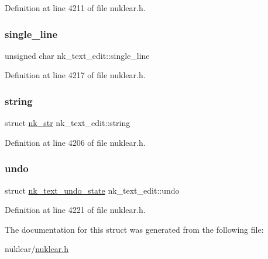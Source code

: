 Definition at line 4211 of file nuklear.\+h.

\mbox{\label{structnk__text__edit_a62aa1bf8ccab646b578c15fee5e6e60d}} 
\subsubsection{\texorpdfstring{single\+\_\+line}{single\_line}}
{\footnotesize\ttfamily unsigned char nk\+\_\+text\+\_\+edit\+::single\+\_\+line}



Definition at line 4217 of file nuklear.\+h.

\mbox{\label{structnk__text__edit_a17295dc427008ac289138943c43ac556}} 
\subsubsection{\texorpdfstring{string}{string}}
{\footnotesize\ttfamily struct \mbox{\hyperlink{structnk__str}{nk\+\_\+str}} nk\+\_\+text\+\_\+edit\+::string}



Definition at line 4206 of file nuklear.\+h.

\mbox{\label{structnk__text__edit_aafeb06f0915d80cd8e4b16e9c3f3ef03}} 
\subsubsection{\texorpdfstring{undo}{undo}}
{\footnotesize\ttfamily struct \mbox{\hyperlink{structnk__text__undo__state}{nk\+\_\+text\+\_\+undo\+\_\+state}} nk\+\_\+text\+\_\+edit\+::undo}



Definition at line 4221 of file nuklear.\+h.



The documentation for this struct was generated from the following file\+:\begin{DoxyCompactItemize}
\item 
nuklear/\mbox{\hyperlink{nuklear_8h}{nuklear.\+h}}\end{DoxyCompactItemize}
